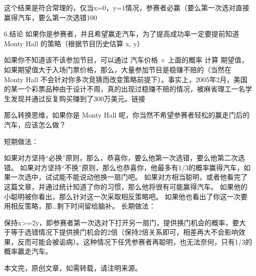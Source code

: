这个结果是符合常理的，仅当x=0，y=1情况，参赛者必赢（要么第一次选对直接赢得汽车，要么第一次选错100%

6.结论
如果你是参赛者，并且希望赢走汽车，为了提高成功率一定要提前知道 Monty Hall 的策略（根据节目历史估算 x, y）

如果你不知道该不该参加节目，可以通过 汽车价格 × 上面的概率 计算 期望值，如果期望值大于入场门票价格，那么，大量参加节目是稳赚不赔的（当然在 Monty Hall 不会针对你多次竞猜而改变策略前提下）。事实上，2005年2月，美国的某一个彩票品种由于设计不周，真的出现过稳赚不赔的情况，被麻省理工一名学生发现并通过反复购买赚到了300万美元。链接

那么转换思维，如果你是 Monty Hall 呢，你当然不希望参赛者轻松的赢走门后的汽车，应该怎么做？

短期做法：

如果对方坚持“必换”原则，那么，恭喜你，要么他第一次选错，要么他第二次选错。
如果对方坚持“不换”原则，那么也恭喜你，他最多有1/3的概率赢得汽车，如果一次选中，试试能不能说动他换一扇门吧。
如果对方相当聪明，或者他看完了这篇文章，并通过统计知道了你的习惯，那么他将很有可能赢得汽车。
如果他的小聪明被你看出，那么针对这一次采取相反策略吧。
如果他也看出了你这一次要用相反策略，那…剩下时间留给脑补。
长期做法：

保持x>=2y，即参赛者第一次选对下打开另一扇门，提供换门机会的概率，要大于等于选错情况下提供换门机会的2倍（保持2倍关系即可，相差再大不会影响效果，反而可能会被诟病）。这种情况下任凭参赛者再聪明，也无法奈何，只有1/3的概率赢走汽车。

本文完，原创文章，如需转载，请注明来源。
